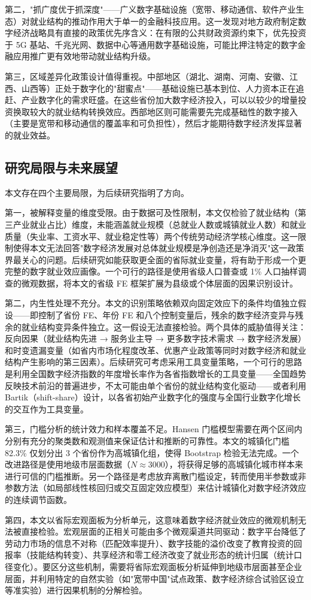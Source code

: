 第二，"抓广度优于抓深度"——广义数字基础设施（宽带、移动通信、软件产业生态）对就业结构的推动作用大于单一的金融科技应用。这一发现对地方政府制定数字经济战略具有直接的政策优先序含义：在有限的公共财政资源约束下，优先投资于 5G 基站、千兆光网、数据中心等通用数字基础设施，可能比押注特定的数字金融应用推广更有效地带动就业结构升级。

第三，区域差异化政策设计值得重视。中部地区（湖北、湖南、河南、安徽、江西、山西等）正处于数字化的"甜蜜点"——基础设施已基本到位、人力资本正在追赶、产业数字化的需求旺盛。在这些省份加大数字经济投入，可以以较少的增量投资换取较大的就业结构转换效应。西部地区则可能需要先完成基础性的数字接入（主要是宽带和移动通信的覆盖率和可负担性），然后才能期待数字经济发挥显著的就业效益。

\subsection{研究局限与未来展望}

本文存在四个主要局限，为后续研究指明了方向。

第一，被解释变量的维度受限。由于数据可及性限制，本文仅检验了就业结构（第三产业就业占比）维度，未能涵盖就业规模（总就业人数或城镇就业人数）和就业质量（失业率、工资水平、就业稳定性等）两个传统劳动经济学核心维度。这一限制使得本文无法回答"数字经济发展对总体就业规模是净创造还是净消灭"这一政策界最关心的问题。后续研究如能获取更全面的省际就业变量，将有助于形成一个更完整的数字就业效应画像。一个可行的路径是使用省级人口普查或 1\% 人口抽样调查的微观数据，将本文的省级 FE 框架扩展为县级或个体层面的因果识别设计。

第二，内生性处理不充分。本文的识别策略依赖双向固定效应下的条件均值独立假设——即控制了省份 FE、年份 FE 和八个控制变量后，残余的数字经济变异与残余的就业结构变异条件独立。这一假设无法直接检验。两个具体的威胁值得关注：反向因果（就业结构先进 → 服务业主导 → 更多数字技术需求 → 数字经济发展）和时变遗漏变量（如省内市场化程度改革、优惠产业政策等同时对数字经济和就业结构产生影响的第三因素）。后续研究可考虑采用工具变量策略，一个可行的思路是利用全国数字经济指数的年度增长率作为各省指数增长的工具变量——全国趋势反映技术前沿的普遍进步，不太可能由单个省份的就业结构变化驱动——或者利用 Bartik（shift-share）设计，以各省初始产业数字化的强度与全国行业数字化增长的交互作为工具变量。

第三，门槛分析的统计效力和样本覆盖不足。Hansen 门槛模型需要在两个区间内分别有充分的聚类数和观测值来保证估计和推断的可靠性。本文的城镇化门槛 82.3\% 仅划分出 3 个省份作为高城镇化组，使得 Bootstrap 检验无法完成。一个改进路径是使用地级市层面数据（$N\approx 3000$），将获得足够的高城镇化城市样本来进行可信的门槛推断。另一个路径是考虑放弃离散门槛设定，转而使用半参数或非参数方法（如局部线性核回归或交互固定效应模型）来估计城镇化对数字经济效应的连续调节函数。

第四，本文以省际宏观面板为分析单元，这意味着数字经济就业效应的微观机制无法被直接检验。宏观层面的正相关可能由多个微观渠道共同驱动：数字平台降低了劳动力市场的信息不对称（匹配效率提升）、数字技能的溢价改变了教育投资的回报率（技能结构转变）、共享经济和零工经济改变了就业形态的统计归属（统计口径变化）。要区分这些机制，需要将省际宏观面板分析延伸到地级市层面甚至企业层面，并利用特定的自然实验（如"宽带中国"试点政策、数字经济综合试验区设立等准实验）进行因果机制的分解检验。

